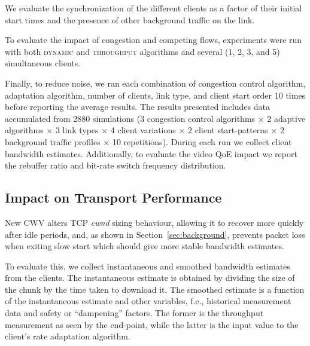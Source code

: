 \documentclass[10pt, acmlarge]{acmart}
\begin{document}
We evaluate the synchronization of the different clients as a factor of their 
initial start times and the presence of other background traffic on the link.

To evaluate the impact of congestion and competing flows, experiments were run with both 
\textsc{dynamic} and \textsc{throughput} algorithms and several (1, 2, 3, and 5) 
simultaneous clients.

Finally, to reduce noise, we ran each combination of congestion control algorithm,
 adaptation algorithm, number of clients, link type, and client start order
  10 times before reporting the average results.
The results presented includes data accumulated from 2880 simulations 
(3 congestion control algorithms $\times$ 2 adaptive algorithms $\times$ 3 link 
types $\times$ 4 client variations $\times$ 2 client start-patterns $\times$ 2
background traffic profiles $\times$ 10 repetitions). 
During each run we collect client bandwidth estimates. Additionally, to evaluate the video 
QoE impact we report the rebuffer ratio and bit-rate switch frequency distribution.

\subsection{Impact on Transport Performance} 
\label{sec:transport-impact}

New CWV alters TCP \emph{cwnd} sizing behaviour, allowing it to recover more quickly 
after idle periods, and, as shown in Section~\ref{sec:background}, prevents packet loss 
when exiting slow start which should give more stable bandwidth estimates. 

To evaluate this, we collect instantaneous and smoothed bandwidth estimates from the clients.
The instantaneous estimate is obtained by dividing the size of the chunk by the time 
taken to download it. The smoothed estimate is a function of the instantaneous estimate and 
other variables, f.e., historical measurement data and safety or ``dampening'' factors.
The former is the throughput measurement as seen by the end-point, while the latter 
is the input value to the client's rate adaptation algorithm.
\end{document}

